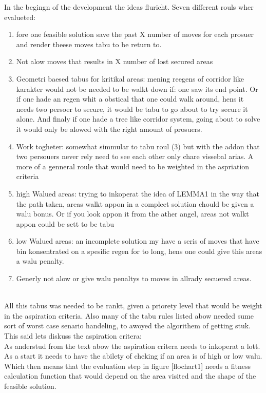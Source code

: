 In the begingn of the development the ideas fluricht. Seven different rouls wher evalueted:
\begin{enumerate}
\item fore one feasible solution save the past X number of moves for each prosuer and render theese moves tabu to be return to.
\item Not alow moves that results in X number of lost secured areas
\item Geometri baesed tabus for kritikal areas:
\subitem mening reegens of corridor like karakter would not be needed to be walkt down if: one saw its end point. Or if one hade an regen whit a obstical that one could walk around, hens it needs two persoer to secure, it would be tabu to go about to try secure it alone. And finaly if one hade a tree like corridor system, going about to solve it would only be alowed with the right amount of prosuers.
\item Work togheter:
\subitem somewhat simmular to tabu roul (3) but with the addon that two persouers never rely need to see each other only chare vissebal arias. A more of a genneral roule that would need to be weighted in the aspriation criteria
\item high Walued areas:
\subitem trying to inkoperat the idea of LEMMA1 in the way that the path taken, areas walkt appon in a compleet solution chould be given a walu bonus. Or if you look appon it from the ather angel, areas not walkt appon could be sett to be tabu 
\item low Walued areas:
\subitem an incomplete solution my have a seris of moves that have bin konsentrated on a spesific regen for to long, hens one could give this areas a walu penalty.
\item Generly not alow or give walu penaltys to moves in allrady secuered areas.
\end{enumerate}
\\
All this tabus was needed to be rankt, given a priorety level that would be weight in the aspiration criteria. Also many of the tabu rules listed abow needed sume sort of worst case senario handeling, to awoyed the algorithem of getting stuk.\\
This said lets diskuss the aspiration critera:\\
As anderstud from the text abow the aspiration critera needs to inkoperat a lott. As a start it needs to have the abilety of cheking if an area is of high or low walu. Which then means that the evaluation step in figure [flochart1] needs a fitness calculation function that would depend on the area visited and the shape of the feasible solution.\\
